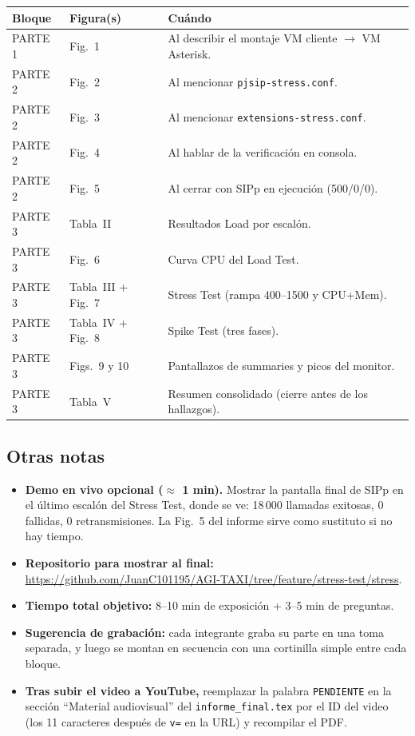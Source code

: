 \documentclass[11pt]{article}
\begin{document}
\medskip
\begin{center}
\footnotesize
\begin{tabular}{l l p{6.5cm}}
\hline
\textbf{Bloque} & \textbf{Figura(s)} & \textbf{Cu\'ando} \\
\hline
PARTE 1 & Fig.~1 & Al describir el montaje VM cliente $\to$ VM Asterisk. \\
PARTE 2 & Fig.~2 & Al mencionar \texttt{pjsip-stress.conf}. \\
PARTE 2 & Fig.~3 & Al mencionar \texttt{extensions-stress.conf}. \\
PARTE 2 & Fig.~4 & Al hablar de la verificaci\'on en consola. \\
PARTE 2 & Fig.~5 & Al cerrar con SIPp en ejecuci\'on (500/0/0). \\
PARTE 3 & Tabla~II & Resultados Load por escal\'on. \\
PARTE 3 & Fig.~6 & Curva CPU del Load Test. \\
PARTE 3 & Tabla~III + Fig.~7 & Stress Test (rampa 400--1500 y CPU+Mem). \\
PARTE 3 & Tabla~IV + Fig.~8 & Spike Test (tres fases). \\
PARTE 3 & Figs.~9 y 10 & Pantallazos de summaries y picos del monitor. \\
PARTE 3 & Tabla~V & Resumen consolidado (cierre antes de los hallazgos). \\
\hline
\end{tabular}
\end{center}

\subsection*{Otras notas}

\begin{itemize}[leftmargin=*,itemsep=2pt]
  \item \textbf{Demo en vivo opcional ($\approx$ 1 min).} Mostrar la pantalla final de SIPp en el \'ultimo escal\'on del Stress Test, donde se ve: 18\,000 llamadas exitosas, 0 fallidas, 0 retransmisiones. La Fig.~5 del informe sirve como sustituto si no hay tiempo.
  \item \textbf{Repositorio para mostrar al final:} \url{https://github.com/JuanC101195/AGI-TAXI/tree/feature/stress-test/stress}.
  \item \textbf{Tiempo total objetivo:} 8--10 min de exposici\'on + 3--5 min de preguntas.
  \item \textbf{Sugerencia de grabaci\'on:} cada integrante graba su parte en una toma separada, y luego se montan en secuencia con una cortinilla simple entre cada bloque.
  \item \textbf{Tras subir el video a YouTube,} reemplazar la palabra \texttt{PENDIENTE} en la secci\'on ``Material audiovisual'' del \texttt{informe\_final.tex} por el ID del video (los 11 caracteres despu\'es de \texttt{v=} en la URL) y recompilar el PDF.
\end{itemize}
\end{document}
